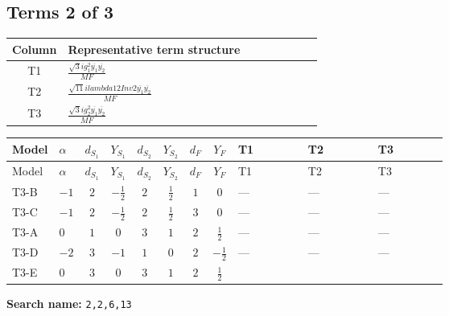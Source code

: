 \documentclass[8pt]{article}
\begin{document}
\begin{landscape}
\subsection*{Terms 2 of 3}
\begin{center}
\begin{tabular}{@{}c >{\raggedright\arraybackslash}p{0.82\linewidth}@{}}
\toprule
Column & Representative term structure \\
\midrule
T1 & \(\displaystyle \frac{\sqrt{3} i g_{1}^{2} \overline{y_{1}} \overline{y_{2}}}{MF}\) \\
\midrule
T2 & \(\displaystyle \frac{\sqrt{11} i lambda12Inv2 \overline{y_{1}} \overline{y_{2}}}{MF}\) \\
\midrule
T3 & \(\displaystyle \frac{\sqrt{3} i g_{2}^{2} \overline{y_{1}} \overline{y_{2}}}{MF}\) \\
\midrule
\bottomrule
\end{tabular}
\end{center}
\smallskip
\tiny
\begin{longtable}{@{}llcccccc >{\raggedright\arraybackslash}p{0.21\linewidth} >{\raggedright\arraybackslash}p{0.21\linewidth} >{\raggedright\arraybackslash}p{0.21\linewidth}@{}}
\toprule
Model & $\alpha$ & $d_{S_1}$ & $Y_{S_1}$ & $d_{S_2}$ & $Y_{S_2}$ & $d_F$ & $Y_F$ & T1 & T2 & T3 \\
\midrule
\endfirsthead
\toprule
Model & $\alpha$ & $d_{S_1}$ & $Y_{S_1}$ & $d_{S_2}$ & $Y_{S_2}$ & $d_F$ & $Y_F$ & T1 & T2 & T3 \\
\midrule
\endhead
T3-B & $-1$ & $2$ & $-\frac{1}{2}$ & $2$ & $\frac{1}{2}$ & $1$ & $0$ & --- & --- & --- \\
\midrule
T3-C & $-1$ & $2$ & $-\frac{1}{2}$ & $2$ & $\frac{1}{2}$ & $3$ & $0$ & --- & --- & --- \\
\midrule
T3-A & $0$ & $1$ & $0$ & $3$ & $1$ & $2$ & $\frac{1}{2}$ & --- & --- & --- \\
\midrule
T3-D & $-2$ & $3$ & $-1$ & $1$ & $0$ & $2$ & $-\frac{1}{2}$ & --- & --- & --- \\
\midrule
T3-E & $0$ & $3$ & $0$ & $3$ & $1$ & $2$ & $\frac{1}{2}$ & \scriptsize\adjustbox{max width=\linewidth}{$\begin{gathered} \frac{\sqrt{3} i g_{1}^{2} \overline{y_{1}} \overline{y_{2}}}{8 MF}\end{gathered}$} & \scriptsize\adjustbox{max width=\linewidth}{$\begin{gathered} \frac{3 \sqrt{11} i lambda12Inv2 \overline{y_{1}} \overline{y_{2}}}{22 MF}\end{gathered}$} & \scriptsize\adjustbox{max width=\linewidth}{$\begin{gathered} \frac{49 \sqrt{3} i g_{2}^{2} \overline{y_{1}} \overline{y_{2}}}{24 MF}\end{gathered}$} \\
\midrule
\bottomrule
\end{longtable}
\clearpage
\noindent\textbf{Search name: }\texttt{2,2,6,13}\par\smallskip

\end{landscape}
\end{document}
